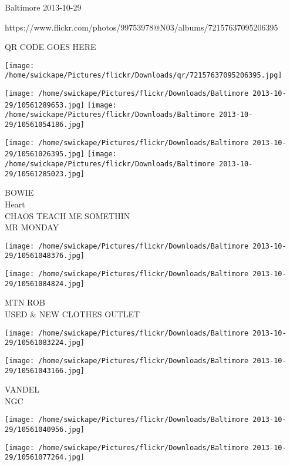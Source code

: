 \documentclass[10pt,letterpaper]{article}
\begin{document}
Baltimore 2013-10-29

https://www.flickr.com/photos/99753978@N03/albums/72157637095206395

QR CODE GOES HERE

\texttt{[image: /home/swickape/Pictures/flickr/Downloads/qr/72157637095206395.jpg]}
\pagebreak

\texttt{[image: /home/swickape/Pictures/flickr/Downloads/Baltimore 2013-10-29/10561289653.jpg]}
\texttt{[image: /home/swickape/Pictures/flickr/Downloads/Baltimore 2013-10-29/10561054186.jpg]}

\texttt{[image: /home/swickape/Pictures/flickr/Downloads/Baltimore 2013-10-29/10561026395.jpg]}
\texttt{[image: /home/swickape/Pictures/flickr/Downloads/Baltimore 2013-10-29/10561285023.jpg]}

BOWIE\\
Heart\\
CHAOS TEACH ME SOMETHIN\\
MR MONDAY\\
\pagebreak

\texttt{[image: /home/swickape/Pictures/flickr/Downloads/Baltimore 2013-10-29/10561048376.jpg]}

\vspace{0.25in}
\texttt{[image: /home/swickape/Pictures/flickr/Downloads/Baltimore 2013-10-29/10561084824.jpg]}

MTN ROB\\
USED \& NEW CLOTHES OUTLET\\
\pagebreak

\texttt{[image: /home/swickape/Pictures/flickr/Downloads/Baltimore 2013-10-29/10561083224.jpg]}

\vspace{0.25in}
\texttt{[image: /home/swickape/Pictures/flickr/Downloads/Baltimore 2013-10-29/10561043166.jpg]}

VANDEL\\
NGC\\
\pagebreak

\texttt{[image: /home/swickape/Pictures/flickr/Downloads/Baltimore 2013-10-29/10561040956.jpg]}

\vspace{0.25in}
\texttt{[image: /home/swickape/Pictures/flickr/Downloads/Baltimore 2013-10-29/10561077264.jpg]}
\end{document}
